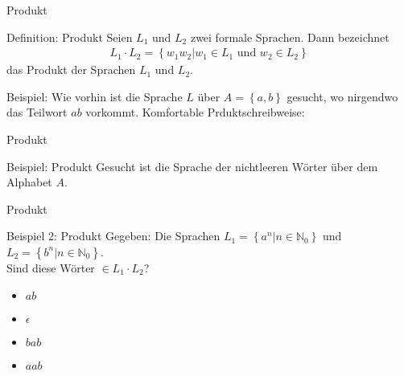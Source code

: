 \begin{frame}{Produkt}
    \begin{block}{Definition: Produkt}
        Seien $L_1$ und $L_2$ zwei formale Sprachen. Dann bezeichnet
        \begin{align*}
            L_1 \cdot L_2 = \left\{ w_1 w_2 | w_1 \in L_1 \text{\ und } w_2 \in L_2 \right\}
        \end{align*}
        das Produkt der Sprachen $L_1$ und $L_2$.
    \end{block}
    \begin{exampleblock}{Beispiel:}
        Wie vorhin ist die Sprache $L$ über $A = \left\{ a, b\right\}$ gesucht, wo nirgendwo das Teilwort $ab$ vorkommt. Komfortable Prduktschreibweise:
        \pause
    \end{exampleblock}
\end{frame}
\begin{frame}{Produkt}
    \begin{exampleblock}{Beispiel: Produkt}
        Gesucht ist die Sprache der nichtleeren Wörter über dem Alphabet $A$.
        \pause
    \end{exampleblock}
\end{frame}
\begin{frame}{Produkt}
    \begin{exampleblock}{Beispiel 2: Produkt}
        Gegeben: Die Sprachen $L_1 = \left\{ a^n | n \in \mathbb{N}_0\right\}$ und $ L_2 = \left\{ b^n | n \in \mathbb{N}_0 \right\}$.\\
        Sind diese Wörter $\in L_1 \cdot L_2$?
        \begin{itemize}
            \item $ab$
                \pause
            \item $\epsilon$
                \pause
            \item $bab$
                \pause
            \item $aab$
                \pause
        \end{itemize}
    \end{exampleblock}
\end{frame}

